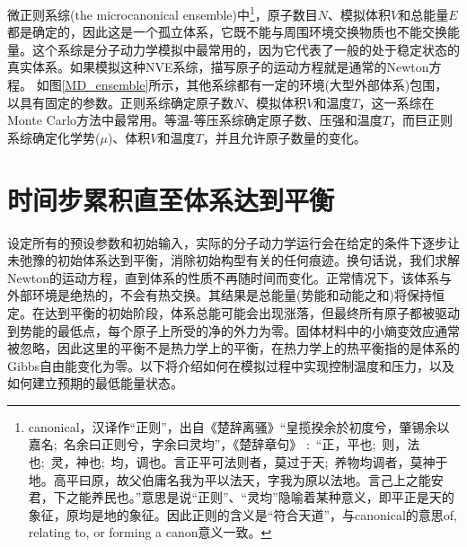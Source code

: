 微正则系综\textrm{(the microcanonical ensemble)}中\footnote{\textrm{canonical}，汉译作``正则''，出自《楚辞\textperiodcentered 离骚》``皇揽揆余於初度兮，肇锡余以嘉名;~名余曰正则兮，字余曰灵均''，《楚辞章句》%
:~``正，平也;~则，法也;~灵，神也;~均，调也。言正平可法则者，莫过于天;~养物均调者，莫神于地。高平曰原，故父伯庸名我为平以法天，字我为原以法地。言己上之能安君，下之能养民也。''意思是说``正则''、``灵均''隐喻着某种意义，即平正是天的象征，原均是地的象征。因此正则的含义是``符合天道''，与\textrm{canonical}的意思\textrm{of, relating to, or forming a canon}意义一致。}，原子数目$N$、模拟体积$V$和总能量$E$都是确定的，因此这是一个孤立体系，它既不能与周围环境交换物质也不能交换能量。这个系综是分子动力学模拟中最常用的，因为它代表了一般的处于稳定状态的真实体系。如果模拟这种NVE系综，描写原子的运动方程就是通常的\textrm{Newton}方程。
如图\ref{MD_ensemble}所示，其他系综都有一定的环境(大型外部体系)包围，以具有固定的参数。正则系综确定原子数$N$、模拟体积$V$和温度$T$，这一系综在\textrm{Monte Carlo}方法中最常用。等温-等压系综确定原子数、压强$和$温度$T$，而巨正则系综确定化学势($\mu$)、体积$V$和温度$T$，并且允许原子数量的变化。

\section{时间步累积直至体系达到平衡}
设定所有的预设参数和初始输入，实际的分子动力学运行会在给定的条件下逐步让未弛豫的初始体系达到平衡，消除初始构型有关的任何痕迹。换句话说，我们求解\textrm{Newton}的运动方程，直到体系的性质不再随时间而变化。正常情况下，该体系与外部环境是绝热的，不会有热交换。其结果是总能量(势能和动能之和)将保持恒定。在达到平衡的初始阶段，体系总能可能会出现涨落，但最终所有原子都被驱动到势能的最低点，每个原子上所受的净的外力为零。固体材料中的小熵变效应通常被忽略，因此这里的平衡不是热力学上的平衡，在热力学上的热平衡指的是体系的\textrm{Gibbs}自由能变化为零。以下将介绍如何在模拟过程中实现控制温度和压力，以及如何建立预期的最低能量状态。
